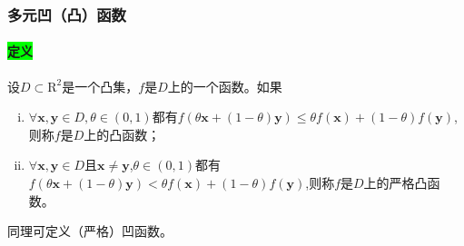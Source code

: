 \documentclass[UTF8]{ctexart}
\newcommand{\x}{\boldsymbol{x}}
\newcommand{\y}{\boldsymbol{y}}
\begin{document}
    \subsubsection{多元凹（凸）函数}
    \paragraph{\colorbox{lime}{定义}}设$D\subset\mathrm{R}^2$是一个凸集，$f$是$D$上的一个函数。如果
    \begin{enumerate}[(i)]
        \item $\forall\x,\y\in D,\theta\in(0,1)$都有$f(\theta\x+(1-\theta)\y)\le \theta f(\x)+(1-\theta)f(\y)$,则称$f$是$D$上的凸函数；
        \item $\forall\x,\y\in D$且$\x\not=\y$,$\theta\in(0,1)$都有$f(\theta\x+(1-\theta)\y)<\theta f(\x)+(1-\theta)f(\y)$,则称$f$是$D$上的严格凸函数。
    \end{enumerate}

    同理可定义（严格）凹函数。
\end{document}
